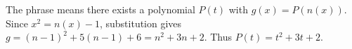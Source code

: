 The phrase means there exists a polynomial $P(t)$ with $g(x)=P(n(x))$. Since $x^2=n(x)-1$, substitution gives $g=(n-1)^2+5(n-1)+6=n^2+3n+2$. Thus $P(t)=t^2+3t+2$.
